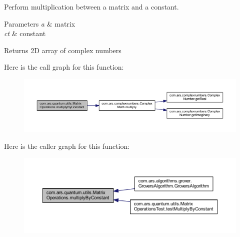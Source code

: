 Perform multiplication between a matrix and a constant. 
\begin{DoxyParams}{Parameters}
{\em a} & matrix \\
\hline
{\em ct} & constant \\
\hline
\end{DoxyParams}
\begin{DoxyReturn}{Returns}
2D array of complex numbers 
\end{DoxyReturn}
Here is the call graph for this function\+:
\nopagebreak
\begin{figure}[H]
\begin{center}
\leavevmode
\includegraphics[width=350pt]{classcom_1_1ars_1_1quantum_1_1utils_1_1_matrix_operations_ac7566a690e0c87a72548e69ea09c0158_cgraph}
\end{center}
\end{figure}
Here is the caller graph for this function\+:
\nopagebreak
\begin{figure}[H]
\begin{center}
\leavevmode
\includegraphics[width=350pt]{classcom_1_1ars_1_1quantum_1_1utils_1_1_matrix_operations_ac7566a690e0c87a72548e69ea09c0158_icgraph}
\end{center}
\end{figure}
\hypertarget{classcom_1_1ars_1_1quantum_1_1utils_1_1_matrix_operations_a7ccc1120dba8158f6cb778ad6a55927d}{}\label{classcom_1_1ars_1_1quantum_1_1utils_1_1_matrix_operations_a7ccc1120dba8158f6cb778ad6a55927d} 
